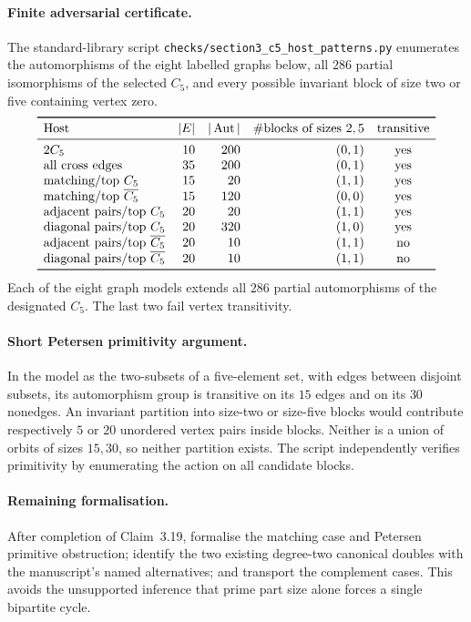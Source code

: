\documentclass[11pt,a4paper]{article}
\begin{document}
\paragraph{Finite adversarial certificate.}
The standard-library script
\texttt{checks/section3\_c5\_host\_patterns.py}
enumerates the automorphisms of the eight labelled
graphs below, all \(286\) partial isomorphisms of the
selected \(C_5\), and every possible invariant block
of size two or five containing vertex zero.
\[
\begin{array}{lrrrc}
\toprule
\text{Host}&|E|&|\operatorname{Aut}|&
\#\text{blocks of sizes }2,5&\text{transitive}\\
\midrule
2C_5&10&200&(0,1)&\mathrm{yes}\\
\text{all cross edges}&35&200&(0,1)&\mathrm{yes}\\
\text{matching/top }C_5&15&20&(1,1)&\mathrm{yes}\\
\text{matching/top }\overline{C_5}&15&120&(0,0)&\mathrm{yes}\\
\text{adjacent pairs/top }C_5&20&20&(1,1)&\mathrm{yes}\\
\text{diagonal pairs/top }C_5&20&320&(1,0)&\mathrm{yes}\\
\text{adjacent pairs/top }\overline{C_5}&20&10&(1,1)&\mathrm{no}\\
\text{diagonal pairs/top }\overline{C_5}&20&10&(1,1)&\mathrm{no}\\
\bottomrule
\end{array}
\]
Each of the eight graph models extends all \(286\)
partial automorphisms of the designated \(C_5\).
The last two fail vertex transitivity.

\paragraph{Short Petersen primitivity argument.}
In the model as the two-subsets of a five-element set,
with edges between disjoint subsets, its automorphism
group is transitive on its \(15\) edges and on its
\(30\) nonedges. An invariant partition into
size-two or size-five blocks would contribute
respectively \(5\) or \(20\) unordered vertex pairs
inside blocks. Neither is a union of orbits of
sizes \(15,30\), so neither partition exists.
The script independently verifies primitivity by
enumerating the action on all candidate blocks.

\paragraph{Remaining formalisation.}
After completion of Claim~3.19, formalise the
matching case and Petersen primitive obstruction;
identify the two existing degree-two canonical
doubles with the manuscript's named alternatives;
and transport the complement cases.
This avoids the unsupported inference that prime
part size alone forces a single bipartite cycle.
\end{document}
